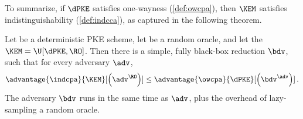 
  To summarize, if $\dPKE$ satisfies one-wayness
    (\cref{def:owcpa}), then $\KEM$ satisfies indistinguishability
    (\cref{def:indcca}), as captured in the following theorem.

  \begin{theorem}
    \label{thm:cparom}
    Let \dPKE be a deterministic PKE scheme, let \RO be a random oracle, 
    and let the $\KEM = \U[\dPKE, \RO]$.
    Then there is a simple, fully black-box reduction $\bdv$, such that for
    every adversary $\adv$,
    \[
      \advantage{\indcpa}{\KEM}[\left(\adv^{\RO}\right)] 
        \leq \advantage{\owcpa}{\dPKE}[\left(\bdv^{\adv}\right)]\, .
    \]
    The adversary $\bdv$ runs in the same time as $\adv$, plus the %
    overhead of lazy-sampling a random oracle.
  \end{theorem}


